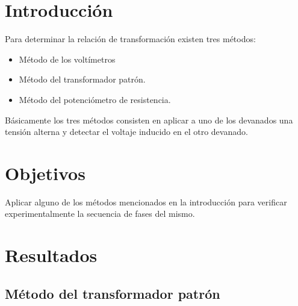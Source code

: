 \documentclass[]{article}
\begin{document}
	
	 
	

	
	
		
	\section{Introducción}
	
	Para determinar la relación de transformación existen tres métodos:\cite{Angelo-kun2015}\\
	
	\begin{itemize}
		\item Método de los voltímetros
		\item Método del transformador patrón.
		\item Método del potenciómetro de resistencia.
	\end{itemize}
	
	Básicamente los tres métodos consisten en aplicar a uno de los devanados una tensión alterna y detectar el voltaje inducido en el otro devanado.\\
		
	\section{Objetivos}
		
	Aplicar alguno de los métodos mencionados en la introducción para verificar experimentalmente la secuencia de fases del mismo.

	\section{Resultados}
	
\subsection{Método del transformador patrón}
\end{document}
